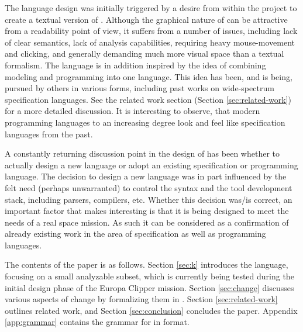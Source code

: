 The \Klang{} language design was initially triggered by a desire from
within the \ems{} project to create a textual version of
\sysml. Although the graphical nature of \sysml{} can be attractive
from a readability point of view, it suffers from a number of issues,
including lack of clear semantics, lack of analysis capabilities,
requiring heavy mouse-movement and clicking, and generally demanding
much more visual space than a textual formalism. The \Klang{} language
is in addition inspired by the idea of combining modeling and
programming into one language. This idea has been, and is being,
pursued by others in various forms, including past works on
wide-spectrum specification languages. See the related work section
(Section \ref{sec:related-work}) for a more detailed discussion. It is
interesting to observe, that modern programming languages to an
increasing degree look and feel like specification languages from the
past.

A constantly returning discussion point in the design of \Klang{} has
been whether to actually design a new language or adopt an existing
specification or programming language. The decision to design a new
language was in part influenced by the felt need (perhaps unwarranted)
to control the syntax and the tool development stack, including
parsers, compilers, etc. Whether this decision was/is correct, an
important factor that makes \Klang{} interesting is that it is being
designed to meet the needs of a real space mission. As such it can be
considered as a confirmation of already existing work in the area of
specification as well as programming languages.

The contents of the paper is as follows. 
Section \ref{sec:k} introduces the \Klang{} language, focusing on a small
analyzable subset, which is currently being tested during the initial 
design phase of the Europa
Clipper mission.
Section \ref{sec:change} discusses various aspects of change by formalizing
them in \Klang.
Section \ref{sec:related-work} outlines related work, and 
Section \ref{sec:conclusion} concludes the paper.
Appendix \ref{app:grammar} contains the grammar for \Klang{} in \antlr{} 
\cite{antlr} format.
